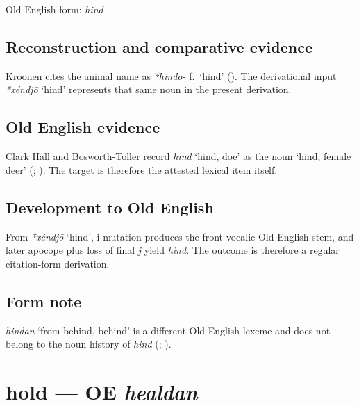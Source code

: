 \documentclass[
  british,
  a4paper,
  openany]{book}
\providecommand{\Recon}[1]{\emph{*#1}}
{\catcode`→=\active \global\def→{\ensuremath{\rightarrow}}}
\providecommand{\texorpdfstring}[2]{#1}
\providecommand{\Recon}[1]{\emph{*#1}}
{\catcode`→=\active \global\def→{\ensuremath{\rightarrow}}}
\begin{document}
Old English form: \emph{hind}

\subsection{Reconstruction and comparative
evidence}\label{reconstruction-and-comparative-evidence-30}

Kroonen cites the animal name as \emph{*hindō-} f.~`hind'
(). The derivational input
\Recon{xéndjō} `hind' represents that same noun in the present
derivation.

\subsection{Old English evidence}\label{old-english-evidence-30}

Clark Hall and Bosworth-Toller record {\emph{hind}} `hind, doe' as the
noun `hind, female deer' (;
). The
target is therefore the attested lexical item itself.

\subsection{Development to Old
English}\label{development-to-old-english-30}

From \Recon{xéndjō} `hind', i-mutation produces the front-vocalic Old
English stem, and later apocope plus loss of final \emph{j} yield
\emph{hind}. The outcome is therefore a regular citation-form
derivation.

\subsection{Form note}\label{form-note-9}

\emph{hindan} `from behind, behind' is a different Old English lexeme
and does not belong to the noun history of \emph{hind}
(;
).

\section{\texorpdfstring{hold --- OE
\emph{healdan}}{hold --- OE healdan}}\label{hold-oe-healdan}

\end{document}
